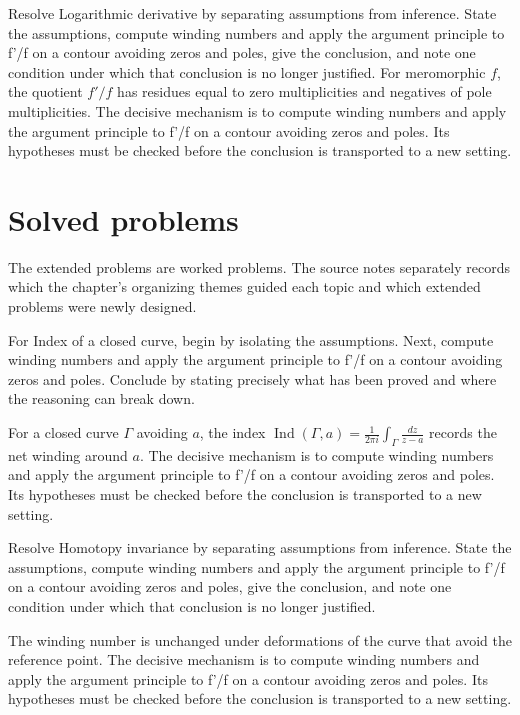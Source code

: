 \begin{example}\label{ex:iv12-worked-04}
Resolve Logarithmic derivative by separating assumptions from inference. State the assumptions, compute winding numbers and apply the argument principle to f'/f on a contour avoiding zeros and poles, give the conclusion, and note one condition under which that conclusion is no longer justified. For meromorphic $f$, the quotient $f'/f$ has residues equal to zero multiplicities and negatives of pole multiplicities. The decisive mechanism is to compute winding numbers and apply the argument principle to f'/f on a contour avoiding zeros and poles. Its hypotheses must be checked before the conclusion is transported to a new setting.
\end{example}

\section{Solved problems}
The extended problems are worked problems. The source notes separately records which the chapter's organizing themes guided each topic and which extended problems were newly designed.

\begin{problem}\label{prob:iv12-problem-01}
For Index of a closed curve, begin by isolating the assumptions. Next, compute winding numbers and apply the argument principle to f'/f on a contour avoiding zeros and poles. Conclude by stating precisely what has been proved and where the reasoning can break down.
\end{problem}
\begin{solution}
For a closed curve $\Gamma$ avoiding $a$, the index $\operatorname{Ind}(\Gamma,a)=\frac{1}{2\pi i}\int_\Gamma \frac{dz}{z-a}$ records the net winding around $a$. The decisive mechanism is to compute winding numbers and apply the argument principle to f'/f on a contour avoiding zeros and poles. Its hypotheses must be checked before the conclusion is transported to a new setting.
\end{solution}

\begin{problem}\label{prob:iv12-problem-02}
Resolve Homotopy invariance by separating assumptions from inference. State the assumptions, compute winding numbers and apply the argument principle to f'/f on a contour avoiding zeros and poles, give the conclusion, and note one condition under which that conclusion is no longer justified.
\end{problem}
\begin{solution}
The winding number is unchanged under deformations of the curve that avoid the reference point. The decisive mechanism is to compute winding numbers and apply the argument principle to f'/f on a contour avoiding zeros and poles. Its hypotheses must be checked before the conclusion is transported to a new setting.
\end{solution}

